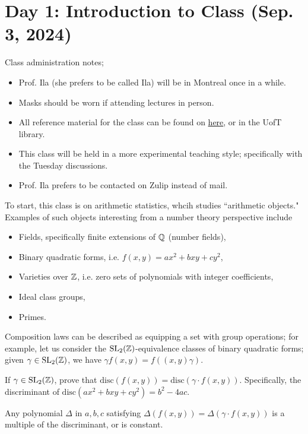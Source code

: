 \section{Day 1: Introduction to Class (Sep. 3, 2024)}
Class administration notes;
\begin{itemize}
    \item Prof. Ila (she prefers to be called Ila) will be in Montreal once in a while.
    \item Masks should be worn if attending lectures in person.
    \item All reference material for the class can be found on \href{https://math.toronto.edu/~ila/math482h1f2024.html}{here}, or in the UofT library.
    \item This class will be held in a more experimental teaching style; specifically with the Tuesday discussions.
    \item Prof. Ila prefers to be contacted on Zulip instead of mail.
\end{itemize}

\noindent To start, this class is on arithmetic statistics, whcih studies ``arithmetic objects." Examples of such objects interesting from a number theory perspective include
\begin{itemize}
    \item Fields, specifically finite extensions of $\mathbb Q$ (number fields),
    \item Binary quadratic forms, i.e. $f(x, y) = ax^2 + bxy + cy^2$,
    \item Varieties over $\mathbb Z$, i.e. zero sets of polynomials with integer coefficients,
    \item Ideal class groups,
    \item Primes.
\end{itemize}

\noindent Composition laws can be described as equipping a set with group operations; for example, let us consider the $\operatorname{SL}_2(\mathbb Z)$-equivalence classes of binary quadratic forms; given $\gamma \in \operatorname{SL}_2(\mathbb Z)$, we have $\gamma f(x, y) = f((x, y) \gamma)$.

\begin{exercise}
    If $\gamma \in \operatorname{SL}_2(\mathbb Z)$, prove that $\mathrm{disc} (f(x, y)) = \mathrm{disc} (\gamma \cdot f(x, y))$. Specifically, the discriminant of $\mathrm{disc}(ax^2 + bxy + cy^2) = b^2 - 4ac$.
\end{exercise}

\begin{exercise}
    Any polynomial $\Delta$ in $a, b, c$ satisfying $\Delta(f(x, y)) = \Delta(\gamma \cdot f(x, y))$ is a multiple of the discriminant, or is constant.
\end{exercise}
